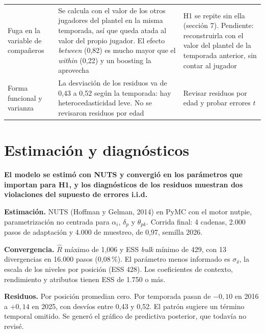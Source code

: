 \documentclass[11pt,a4paper]{article}
\newcommand{\var}[1]{\texttt{\detokenize{#1}}}
\newcommand{\lead}[1]{\textbf{#1}}
\begin{document}
{\begin{longtable}{@{}>{\raggedright\arraybackslash}p{3.3cm}>{\raggedright\arraybackslash}p{6.0cm}>{\raggedright\arraybackslash}p{5.2cm}@{}}
\addlinespace
Fuga en la variable de compañeros & Se calcula con el valor de los otros jugadores del plantel en la misma temporada, así que queda atada al valor del propio jugador. El efecto \emph{between} (0,82) es mucho mayor que el \emph{within} (0,22) y un boosting la aprovecha & H1 se repite sin ella (sección 7). Pendiente: reconstruirla con el valor del plantel de la temporada anterior, sin contar al jugador \\
\addlinespace
Forma funcional y varianza & La desviación de los residuos va de 0,43 a 0,52 según la temporada: hay heterocedasticidad leve. No se revisaron residuos por edad & Revisar residuos por edad y probar errores $t$ \\
\end{longtable}
}

\section{Estimación y diagnósticos}

\lead{El modelo se estimó con NUTS y convergió en los parámetros que importan para H1, y los diagnósticos de los residuos muestran dos violaciones del supuesto de errores i.i.d.}

\lead{Estimación.} NUTS (Hoffman y Gelman, 2014) en PyMC con el motor nutpie, parametrización no centrada para $\alpha_i$, $\delta_p$ y $\theta_{pk}$. Corrida final: 4 cadenas, 2.000 pasos de adaptación y 4.000 de muestreo, \var{target_accept} de 0,97, semilla 2026.

\lead{Convergencia.} $\hat{R}$ máximo de 1,006 y ESS \emph{bulk} mínimo de 429, con 13 divergencias en 16.000 pasos (0,08\,\%). El parámetro menos informado es $\sigma_\delta$, la escala de los niveles por posición (ESS 428). Los coeficientes de contexto, rendimiento y atributos tienen ESS de 1.750 o más.

\lead{Residuos.} Por posición promedian cero. Por temporada pasan de $-0{,}10$ en 2016 a $+0{,}14$ en 2025, con desvíos entre 0,43 y 0,52. El patrón sugiere un término temporal omitido. Se generó el gráfico de predictiva posterior, que todavía no revisé.
\end{document}
